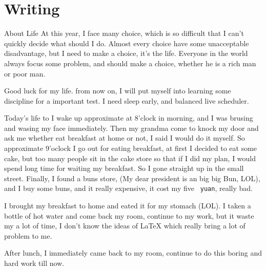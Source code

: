\chapter{Writing}

\begin{writing}[18-8-15]{About Life}
    At this year, I face many choice, which is so difficult that I can't
    quickly decide what should I do.
    Almost every choice have some unacceptable disadvantage, but I need 
    to make a choice, it's the life.
    Everyone in the world always focus some problem, and should make a choice, 
    whether he is a rich man or poor man.

    Good luck for my life. from now on, I will put myself into learning
    some discipline for a important test. I need sleep early, and balanced
    live scheduler.
\end{writing}

\bigskip

\begin{writing}[18-8-16]{Today's life}
\noindent\hbox to
\smallskip
I wake up approximate at 8'clock in morning, and I was brusing and wasing my face immediately.
Then my grandma come to knock my door and ask me whether eat breakfast at home or not, 
I said I would do it myself. So approximate 9'oclock I go out for eating breakfast, at first I
decided to eat some cake, but too many people sit in the cake store so that if I did my plan, I would 
spend long time for waiting my breakfast. So I gone straight up in the small street. Finally,
I found a buns store, ({\color{google@red}My dear president is an big big Bun, LOL}), and I buy some buns, 
and it really expensive, it cost my five {\tt\color{blue} yuan}, really bad.

I brought my breakfast to home and eated it for my stomach (LOL). I taken a bottle of hot water and 
come back my room, continue to my work, but it waste my a lot of time, I don't know the ideas of \LaTeX
which really bring a lot of problem to me.

After lunch, I immediately came back to my room, continue to do this boring and hard work till now.
\end{writing}

\break

